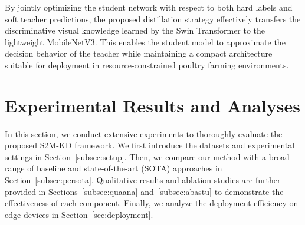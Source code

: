 \documentclass[review]{elsarticle}
\begin{document}
By jointly optimizing the student network with respect to both hard labels and soft teacher predictions, the proposed distillation strategy effectively transfers the discriminative visual knowledge learned by the Swin Transformer to the lightweight MobileNetV3. This enables the student model to approximate the decision behavior of the teacher while maintaining a compact architecture suitable for deployment in resource-constrained poultry farming environments.

\section{Experimental Results and Analyses}
In this section, we conduct extensive experiments to thoroughly evaluate the proposed S2M-KD framework. We first introduce the datasets and experimental settings in Section~\ref{subsec:setup}. Then, we compare our method with a broad range of baseline and state-of-the-art (SOTA) approaches in Section~\ref{subsec:persota}. Qualitative results and ablation studies are further provided in Sections~\ref{subsec:quaana} and~\ref{subsec:abastu} to demonstrate the effectiveness of each component. Finally, we analyze the deployment efficiency on edge devices in Section~\ref{sec:deployment}.

\begin{table}[t]
\centering
\caption{\small Statistics and splitting details of the three experimental datasets. The split ratios are approximate due to rounding.}
\vspace{-1em}
\label{tab:datasets}
\end{table}

\label{subsec:setup}
\end{document}
